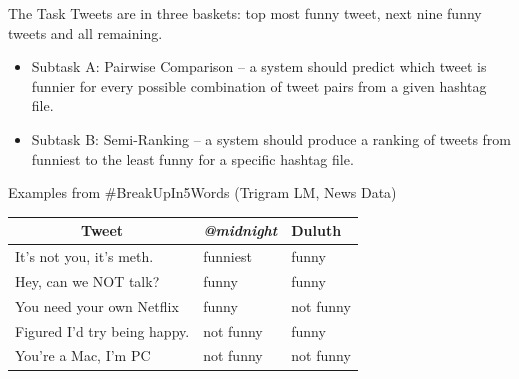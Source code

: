 \documentclass[final]{beamer}
\newlength{\twocolwid}
\begin{document}
\begin{frame}[t]
\begin{columns}[t]
\begin{column}{\twocolwid} %


\begin{block}{The Task}
Tweets are in three baskets: top most funny tweet, next nine funny tweets and all remaining.%
\begin{itemize}
\item Subtask A: Pairwise Comparison -- a system should predict which tweet is funnier for every possible combination of tweet pairs from a given hashtag file.
\item Subtask B: Semi-Ranking -- a system should produce a ranking of tweets from funniest to the least funny for a specific hashtag file. 
\end{itemize}
\end{block}




\begin{alertblock}{Examples from \#BreakUpIn5Words (Trigram LM, News Data)}

\begin{table}[h!]
\centering
\begin{tabular} {  p{30cm} | p{10cm} | p{10cm} }
\toprule
\multicolumn{1}{c|}{\Large Tweet} & \Large \textit{@midnight} & \Large Duluth \\
\hline
\Large It's not you, it's meth. & \Large funniest & \Large funny \\
\Large Hey, can we NOT talk? & \Large funny & \Large funny \\
\Large You need your own Netflix  & \Large funny & \Large not funny \\
\Large Figured I'd try being happy.  & \Large not funny & \Large funny \\
\Large You're a Mac, I'm PC & \Large not funny & \Large not funny \\	
\bottomrule
\end{tabular}
\end{table}
\end{alertblock}



\end{column}
\end{columns}
\end{frame}
\end{document}
